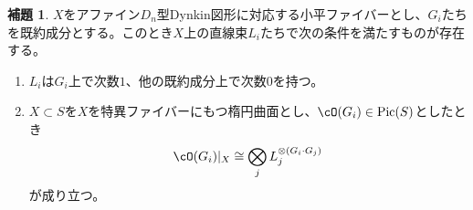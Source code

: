 \documentclass[uplatex, a4paper, dvipdfmx]{jsarticle}
\theoremstyle{definition}
\newtheorem{lemma}[theorem]{補題}
\DeclareMathOperator{\Pic}{\mathrm{Pic}}
\begin{document}
\begin{lemma}\label{lem:special-line-bundles}
    $X$をアファイン$D_n$型Dynkin図形に対応する小平ファイバーとし、$G_i$たちを既約成分とする。このとき$X$上の直線束$L_i$たちで次の条件を満たすものが存在する。
    \begin{enumerate}
        \item $L_i$は$G_i$上で次数$1$、他の既約成分上で次数$0$を持つ。
        \item $X \subset S$を$X$を特異ファイバーにもつ楕円曲面とし、$\cO(G_i) \in \Pic(S)$としたとき
              \begin{equation}
                  \cO(G_i)\vert_X \cong \bigotimes_j L_j^{\otimes (G_i\cdot G_j)}
              \end{equation}
              が成り立つ。
    \end{enumerate}
\end{lemma}
\end{document}

